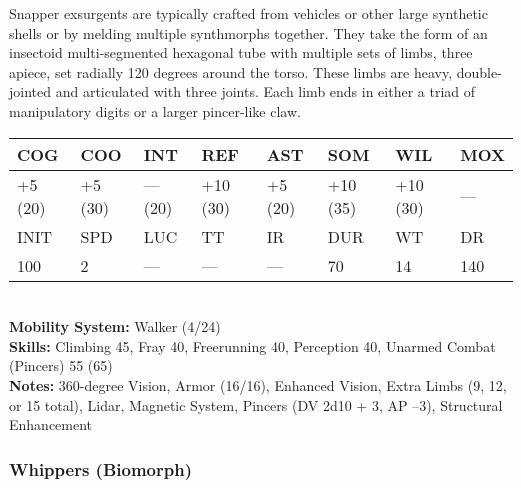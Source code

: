 Snapper exsurgents are typically crafted from vehicles or other large synthetic shells or by melding multiple synthmorphs together. They take the form of an insectoid multi-segmented hexagonal tube with multiple sets of limbs, three apiece, set radially 120 degrees around the torso. These limbs are heavy, double-jointed and articulated with three joints. Each limb ends in either a triad of manipulatory digits or a larger pincer-like claw. \\ \begin{tabular}{|l|l|l|l|l|l|l|l|} \hline

COG &COO &INT &REF &AST &SOM &WIL &MOX \\ \hline

+5 (20) &+5 (30) &— (20) &+10 (30) &+5 (20) &+10 (35) &+10 (30) &— \\ \hline

INIT &SPD &LUC &TT &IR &DUR &WT &DR \\ \hline

100 &2 &— &— &— &70 &14 &140 \\ \hline

\end{tabular} \\ \textbf{Mobility System:} Walker (4/24) \\ \textbf{Skills:} Climbing 45, Fray 40, Freerunning 40, Perception 40, Unarmed Combat (Pincers) 55 (65) \\ \textbf{Notes: }360-degree Vision, Armor (16/16), Enhanced Vision, Extra Limbs (9, 12, or 15 total), Lidar, Magnetic System, Pincers (DV 2d10 + 3, AP –3), Structural Enhancement 

\subsubsection{Whippers (Biomorph)} 

